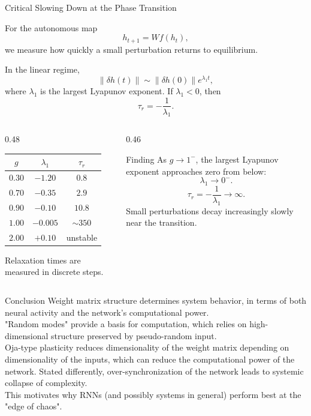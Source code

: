 \documentclass[
11pt,notheorems,hyperref={pdfauthor=whatever}
]{beamer}
\begin{document}
\begin{frame}{Critical Slowing Down at the Phase Transition}
\small

For the autonomous map
\[
h_{t+1}=Wf(h_t),
\]
we measure how quickly a small perturbation returns to equilibrium.

\vspace{0.4em}

In the linear regime,
\[
\|\delta h(t)\|\sim \|\delta h(0)\|e^{\lambda_1 t},
\]
where \(\lambda_1\) is the largest Lyapunov exponent. If \(\lambda_1<0\), then
\[
\tau_r=-\frac{1}{\lambda_1}.
\]

\vspace{0.6em}

\begin{columns}[T]
\begin{column}{0.48\textwidth}
\centering
\begin{tabular}{ccc}
\hline
\(g\) & \(\lambda_1\) & \(\tau_r\) \\
\hline
\(0.30\) & \(-1.20\) & \(0.8\) \\
\(0.70\) & \(-0.35\) & \(2.9\) \\
\(0.90\) & \(-0.10\) & \(10.8\) \\
\(1.00\) & \(-0.005\) & \(\sim 350\) \\
\(2.00\) & \(+0.10\) & unstable \\
\hline
\end{tabular}

\vspace{0.3em}
{\scriptsize Relaxation times are measured in discrete steps.}
\end{column}

\begin{column}{0.46\textwidth}
\begin{block}{Finding}
As \(g\to 1^{-}\), the largest Lyapunov exponent approaches zero from below:
\[
\lambda_1\to 0^-.
\]
\[
\tau_{r}=-\frac{1}{\lambda_1}\to \infty.
\]
Small perturbations decay increasingly slowly near the transition.
\end{block}
\end{column}
\end{columns}

\end{frame}

\begin{frame}{Conclusion}
    Weight matrix structure determines system behavior, in terms of both neural activity and the network's computational power.
    \[\]
    "Random modes" provide a basis for computation, which relies on high-dimensional structure preserved by pseudo-random input.
    \[\]
    Oja-type plasticity reduces dimensionality of the weight matrix depending on dimensionality of the inputs, which can reduce the computational power of the network. Stated differently, over-synchronization of the network leads to systemic collapse of complexity.
    \[\]
    This motivates why RNNs (and possibly systems in general) perform best at the "edge of chaos".
\end{frame}
\end{document}
